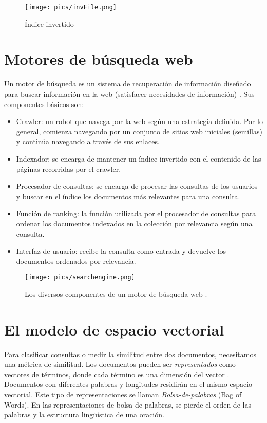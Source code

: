 \begin{figure}[h!]
\centering
\texttt{[image: pics/invFile.png]}
\caption{Índice invertido}
\end{figure}

\section{Motores de búsqueda web}

Un motor de búsqueda es un sistema de recuperación de información diseñado para buscar información en la web (satisfacer necesidades de información) \cite{manning2008}. Sus componentes básicos son:

\begin{itemize}
\item Crawler: un robot que navega por la web según una estrategia definida. Por lo general, comienza navegando por un conjunto de sitios web iniciales (semillas) y continúa navegando a través de sus enlaces.
\item Indexador: se encarga de mantener un índice invertido con el contenido de las páginas recorridas por el crawler.
\item Procesador de consultas: se encarga de procesar las consultas de los usuarios y buscar en el índice los documentos más relevantes para una consulta.
\item Función de ranking: la función utilizada por el procesador de consultas para ordenar los documentos indexados en la colección por relevancia según una consulta.
\item Interfaz de usuario: recibe la consulta como entrada y devuelve los documentos ordenados por relevancia.
\end{itemize}

\begin{figure}[h!]
\centering
\texttt{[image: pics/searchengine.png]}
\caption{Los diversos componentes de un motor de búsqueda web \cite{manning2008}.}
\end{figure}


\section{El modelo de espacio vectorial}
Para clasificar consultas o medir la similitud entre dos documentos, necesitamos una métrica de similitud. Los documentos pueden ser \textit{representados} como vectores de términos, donde cada término es una dimensión del vector \cite{salton1975vector}. Documentos con diferentes palabras y longitudes residirán en el mismo espacio vectorial. Este tipo de representaciones se llaman \emph{Bolsa-de-palabras} (Bag of Words). En las representaciones de bolsa de palabras, se pierde el orden de las palabras y la estructura lingüística de una oración.

